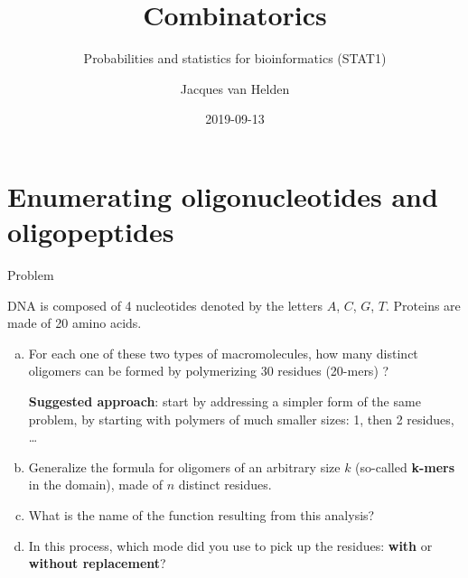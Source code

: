 \documentclass[ignorenonframetext,]{beamer}
\title{Combinatorics}
\subtitle{Probabilities and statistics for bioinformatics (STAT1)}
\author{Jacques van Helden}
\date{2019-09-13}
\begin{document}
\frame{\titlepage}

\begin{frame}
\tableofcontents[hideallsubsections]
\end{frame}
\hypertarget{enumerating-oligonucleotides-and-oligopeptides}{%
\section{Enumerating oligonucleotides and
oligopeptides}\label{enumerating-oligonucleotides-and-oligopeptides}}

\begin{frame}{Problem}
\protect\hypertarget{problem}{}

DNA is composed of 4 nucleotides denoted by the letters \(A\), \(C\),
\(G\), \(T\). Proteins are made of 20 amino acids.

\begin{enumerate}
[a.]
\item
  For each one of these two types of macromolecules, how many distinct
  oligomers can be formed by polymerizing 30 residues (20-mers) ?

  \textbf{Suggested approach}: start by addressing a simpler form of the
  same problem, by starting with polymers of much smaller sizes: 1, then
  2 residues, \ldots{}
\item
  Generalize the formula for oligomers of an arbitrary size \(k\)
  (so-called \textbf{k-mers} in the domain), made of \(n\) distinct
  residues.
\item
  What is the name of the function resulting from this analysis?
\item
  In this process, which mode did you use to pick up the residues:
  \textbf{with} or \textbf{without replacement}?
\end{enumerate}

\end{frame}
\end{document}
